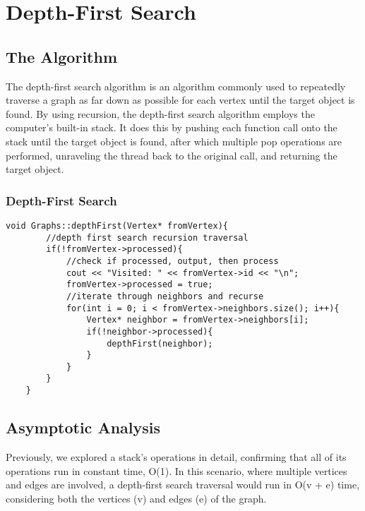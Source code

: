 \documentclass[letterpaper, 10pt,DIV=13]{scrartcl}
\numberwithin{equation}{section} %
\numberwithin{figure}{section} %
\numberwithin{table}{section} %
\begin{document}
\section{Depth-First Search}

\subsection{The Algorithm}
The depth-first search algorithm is an algorithm commonly used to repeatedly traverse a graph as far down as possible for each vertex until the target object is found. By using recursion, the depth-first search algorithm employs the computer's built-in stack. It does this by pushing each function call onto the stack until the target object is found, after which multiple pop operations are performed, unraveling the thread back to the original call, and returning the target object.

\subsubsection*{Depth-First Search}
    \lstset{numbers=left, numberstyle=\tiny, stepnumber=1, numbersep=5pt, basicstyle=\footnotesize\ttfamily}
    \begin{lstlisting}[frame=single, ]
    void Graphs::depthFirst(Vertex* fromVertex){
        //depth first search recursion traversal
        if(!fromVertex->processed){
            //check if processed, output, then process
            cout << "Visited: " << fromVertex->id << "\n";
            fromVertex->processed = true;
            //iterate through neighbors and recurse
            for(int i = 0; i < fromVertex->neighbors.size(); i++){
                Vertex* neighbor = fromVertex->neighbors[i];
                if(!neighbor->processed){
                    depthFirst(neighbor);
                }
            }
        }
    }

\end{lstlisting}

\subsection{Asymptotic Analysis}
Previously, we explored a stack's operations in detail, confirming that all of its operations run in constant time, O(1). In this scenario, where multiple vertices and edges are involved, a depth-first search traversal would run in O(v + e) time, considering both the vertices (v) and edges (e) of the graph.
\end{document}
